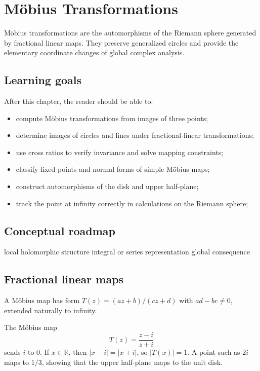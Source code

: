 \chapter{Möbius Transformations}
\label{ch:iv16}

Möbius transformations are the automorphisms of the Riemann sphere generated by fractional linear maps. They preserve generalized circles and provide the elementary coordinate changes of global complex analysis.

\section*{Learning goals}
After this chapter, the reader should be able to:
\begin{itemize}
\item compute Möbius transformations from images of three points;
\item determine images of circles and lines under fractional-linear transformations;
\item use cross ratios to verify invariance and solve mapping constraints;
\item classify fixed points and normal forms of simple Möbius maps;
\item construct automorphisms of the disk and upper half-plane;
\item track the point at infinity correctly in calculations on the Riemann sphere;
\end{itemize}
\section*{Conceptual roadmap}
\volroadmap
  {local holomorphic structure}
  {integral or series representation}
  {global consequence}

\section{Fractional linear maps}
A Möbius map has form $T(z)=(az+b)/(cz+d)$ with $ad-bc\ne0$, extended naturally to infinity.

\begin{example}\label{ex:iv16-expand-01}
The Möbius map
\[
T(z)=\frac{z-i}{z+i}
\]
sends \(i\) to \(0\). If \(x\in\mathbb R\), then \(|x-i|=|x+i|\), so \(|T(x)|=1\). A point such as \(2i\) maps to \(1/3\), showing that the upper half-plane maps to the unit disk.
\end{example}

